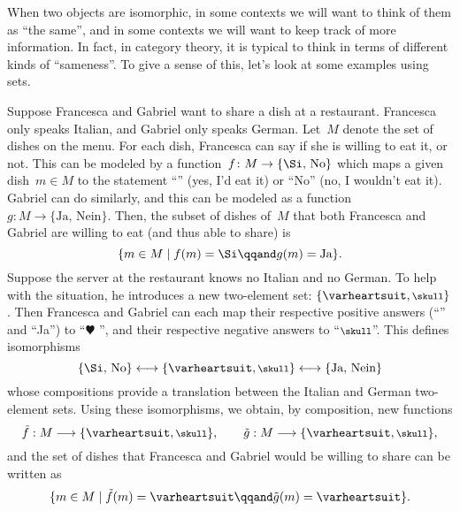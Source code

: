 When two objects are isomorphic, in some contexts we will want to think of them as ``the same'', and in some contexts we will want to keep track of more information.
In fact, in category theory, it is typical to think in terms of different kinds of ``sameness''.
To give a sense of this, let's look at some examples using sets.

\begin{example}
	Suppose Francesca and Gabriel want to share a dish at a restaurant.
	Francesca only speaks Italian, and Gabriel only speaks German.
	Let~$M$ denote the set of dishes on the menu.
	For each dish, Francesca can say if she is willing to eat it, or not.
	This can be modeled by a function~$f\colon M \to \{ \text{\Si, No} \}$ which maps a given dish~$m \in M$ to the statement ``\Si'' (yes, I'd eat it) or ``No'' (no, I wouldn't eat it).
	Gabriel can do similarly, and this can be modeled as a function~$g\colon M \to \{ \text{Ja, Nein} \}$.
	Then, the subset of dishes of~$M$ that both Francesca and Gabriel are willing to eat (and thus able to share) is
	\begin{equation*}
		\{ m \in M \mid f(m) = \text{\Si}  \qqand  g(m) = \text{Ja} \}.
	\end{equation*}
	Suppose the server at the restaurant knows no Italian and no German.
	To help with the situation, he introduces a new two-element set: $\{ \varheartsuit, \mbox{\footnotesize $\skull$} \}$.
	Then Francesca and Gabriel can each map their respective positive answers (``\Si'' and ``Ja'') to ``$\varheartsuit$ '', and their respective negative answers to ``$\mbox{\footnotesize $\skull$}$''.
	This defines isomorphisms
	\begin{equation*}
		\{ \text{\Si, No} \} \longleftrightarrow \{ \varheartsuit, \mbox{\footnotesize $\skull$} \} \longleftrightarrow \{ \text{Ja, Nein} \}
	\end{equation*}
	whose compositions provide a translation between the Italian and German two-element sets.
	Using these isomorphisms, we obtain, by composition, new functions
	\begin{equation*}
		\tilde f: M \longrightarrow \{ \varheartsuit, \mbox{\footnotesize $\skull$} \}, \qquad \tilde g: M \longrightarrow \{ \varheartsuit, \mbox{\footnotesize $\skull$} \},
	\end{equation*}
	and the set of dishes that Francesca and Gabriel would be willing to share can be written as
	\begin{equation*}
		\{ m \in M \mid \tilde f(m) = \varheartsuit \qqand \tilde g(m) = \varheartsuit \}.
	\end{equation*}


\end{example}
